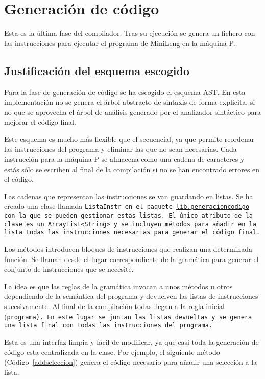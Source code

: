 \section{Generación de código}
Esta es la última fase del compilador. Tras su ejecución se genera un fichero con las instrucciones para ejecutar el programa de MiniLeng en la máquina P.

\subsection{Justificación del esquema escogido}\label{eleccion}
Para la fase de generación de código se ha escogido el esquema AST. En esta implementación no se genera el árbol abstracto de sintaxis de forma explicita, si no que se aprovecha el árbol de análisis generado por el analizador sintáctico para mejorar el código final.

Este esquema es mucho más flexible que el secuencial, ya que permite reordenar las instrucciones del programa y eliminar las que no sean necesarias. Cada instrucción para la máquina P se almacena como una cadena de caracteres y estás sólo se escriben al final de la compilación si no se han encontrado errores en el código.

Las cadenas que representan las instrucciones se van guardando en listas. Se ha creado una clase llamada \tt{ListaInstr} en el paquete \url{lib.generacioncodigo} con la que se pueden gestionar estas listas. El único atributo de la clase es un \tt{ArrayList<String>} y se incluyen métodos para añadir en la lista todas las instrucciones necesarias para generar el código final.

Los métodos introducen bloques de instrucciones que realizan una determinada función. Se llaman desde el lugar correspondiente de la gramática para generar el conjunto de instrucciones que se necesite.

La idea es que las reglas de la gramática invocan a unos métodos u otros dependiendo de la semántica del programa y devuelven las listas de instrucciones sucesivamente. Al final de la compilación todas llegan a la regla inicial (\tt{programa}). En este lugar se juntan las listas devueltas y se genera una lista final con todas las instrucciones del programa.

Esta es una interfaz limpia y fácil de modificar, ya que casi toda la generación de código esta centralizada en la clase. Por ejemplo, el siguiente método (Código~\ref{addseleccion}) genera el código necesario para añadir una selección a la lista.

